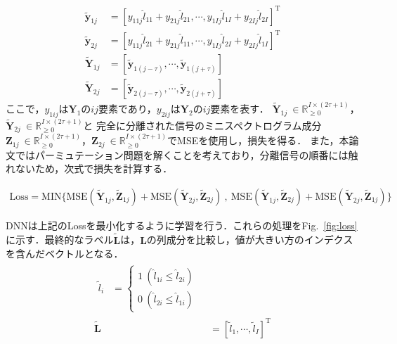 \begin{align}
    \widetilde{\bm{y}}_{1 j} &= [{y}_{1 1 j} \widehat{l}_{1 1} + y_{2 1 j} \widehat{l}_{2 1}, \cdots, {y}_{1 I j} \widehat{l}_{1 I} + y_{2 I j} \widehat{l}_{2 I}]^\mathrm{T}\\
    \widetilde{\bm{y}}_{2 j} &= [{y}_{1 1 j} \widehat{l}_{2 1} + y_{2 1 j} \widehat{l}_{1 1}, \cdots, {y}_{1 I j} \widehat{l}_{2 I} + y_{2 I j} \widehat{l}_{1 I}]^\mathrm{T}\\
    \widetilde{\bm{Y}}_{1 j} &= [\widetilde{\bm{y}}_{1 (j-\tau)}, \cdots, \widetilde{\bm{y}}_{1 (j+\tau)}] \\
    \widetilde{\bm{Y}}_{2 j} &= [\widetilde{\bm{y}}_{2 (j-\tau)}, \cdots, \widetilde{\bm{y}}_{2 (j+\tau)}] 
\end{align}
ここで，${y}_{1 i j}$は$\bm{Y}_1$の$ij$要素であり，${y}_{2 i j}$は$\bm{Y}_2$の$ij$要素を表す．
$\widetilde{\bm{Y}}_{1 j} ~\in \mathbb{R}_{\geq 0}^{I \times (2\tau+1)}$，$\widetilde{\bm{Y}}_{2 j} ~\in \mathbb{R}_{\geq 0}^{I \times (2\tau+1)}$と
完全に分離された信号のミニスペクトログラム成分$\bm{Z}_{1 j}~\in \mathbb{R}_{\geq 0}^{I \times (2\tau+1)}$，$\bm{Z}_{2 j}~\in \mathbb{R}_{\geq 0}^{I \times (2\tau+1)}$でMSEを使用し，損失を得る．
また，本論文ではパーミュテーション問題を解くことを考えており，分離信号の順番には触れないため，次式で損失を計算する．

\begin{align}
    \mathrm{Loss} = \mathrm{MIN}\{\mathrm{MSE}(\widetilde{\bm{Y}}_{1 j}, \widetilde{\bm{Z}}_{1 j}) + \mathrm{MSE}(\widetilde{\bm{Y}}_{2 j}, \widetilde{\bm{Z}}_{2 j}) ~ , ~ \mathrm{MSE}(\widetilde{\bm{Y}}_{1 j}, \widetilde{\bm{Z}}_{2 j}) + \mathrm{MSE}(\widetilde{\bm{Y}}_{2 j}, \widetilde{\bm{Z}}_{1 j})\}
\end{align}

DNNは上記のLossを最小化するように学習を行う．これらの処理をFig.~\ref{fig:loss}に示す．最終的なラベル$\widetilde{\bm{L}}$は，$\bm{L}$の列成分を比較し，値が大きい方のインデクスを含んだベクトルとなる．
\begin{align}
    \begin{split}
        \widetilde{l}_i &= \left \{
            \begin{array}{l}
                1~(\widehat{l}_{1i} \leq \widehat{l}_{2i}) \\
                0~(\widehat{l}_{2i} \leq \widehat{l}_{1i})
            \end{array}
        \right.
    \end{split}\\
    \widetilde{\bm{L}} &= [\widetilde{l}_1, \cdots, \widetilde{l}_I]^\mathrm{T}
\end{align}

